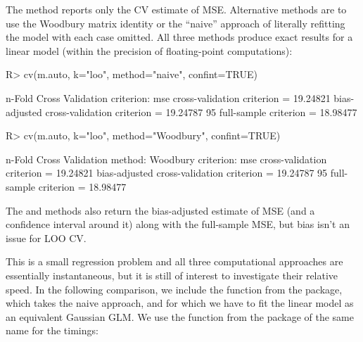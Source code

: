 \documentclass[
]{jss}
\begin{document}
The  method reports only the CV estimate of MSE.
Alternative methods are to use the Woodbury matrix identity or the
``naive'' approach of literally refitting the model with each case
omitted. All three methods produce exact results for a linear model
(within the precision of floating-point computations):

\begin{CodeChunk}
\begin{CodeInput}
R> cv(m.auto, k="loo", method="naive", confint=TRUE)
\end{CodeInput}
\begin{CodeOutput}
n-Fold Cross Validation
criterion: mse
cross-validation criterion = 19.24821
bias-adjusted cross-validation criterion = 19.24787
95%
full-sample criterion = 18.98477 
\end{CodeOutput}
\begin{CodeInput}
R> cv(m.auto, k="loo", method="Woodbury", confint=TRUE)
\end{CodeInput}
\begin{CodeOutput}
n-Fold Cross Validation
method: Woodbury
criterion: mse
cross-validation criterion = 19.24821
bias-adjusted cross-validation criterion = 19.24787
95%
full-sample criterion = 18.98477 
\end{CodeOutput}
\end{CodeChunk}

The  and  methods also return the
bias-adjusted estimate of MSE (and a confidence interval around it)
along with the full-sample MSE, but bias isn't an issue for LOO CV.

This is a small regression problem and all three computational
approaches are essentially instantaneous, but it is still of interest to
investigate their relative speed. In the following comparison, we
include the  function from the  package, which
takes the naive approach, and for which we have to fit the linear model
as an equivalent Gaussian GLM. We use the 
function from the package of the same name \citep{Mersmann:2023} for the
timings:
\end{document}
